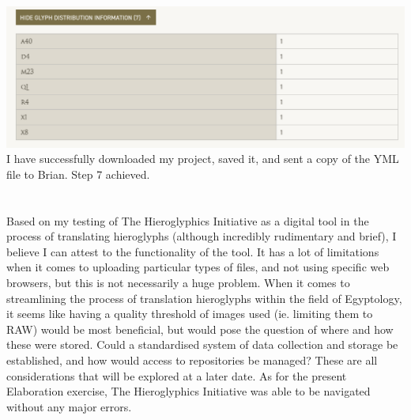 \documentclass{article}
\begin{document}
\newline \break
\includegraphics[width=1.0\textwidth]{hiero_19.PNG}
\break \noindent
I have successfully downloaded my project, saved it, and sent a copy of the YML file to Brian.
\newline \break \noindent
Step 7 achieved.
\paragraph{} ~\\\noindent
Based on my testing of The Hieroglyphics Initiative as a digital tool in the process of translating hieroglyphs (although incredibly rudimentary and brief), I believe I can attest to the functionality of the tool. It has a lot of limitations when it comes to uploading particular types of files, and not using specific web browsers, but this is not necessarily a huge problem. When it comes to streamlining the process of translation hieroglyphs within the field of Egyptology, it seems like having a quality threshold of images used (ie. limiting them to RAW) would be most beneficial, but would pose the question of where and how these were stored. Could a standardised system of data collection and storage be established, and how would access to repositories be managed? These are all considerations that will be explored at a later date. As for the present Elaboration exercise, The Hieroglyphics Initiative was able to be navigated without any major errors.
\end{document}
